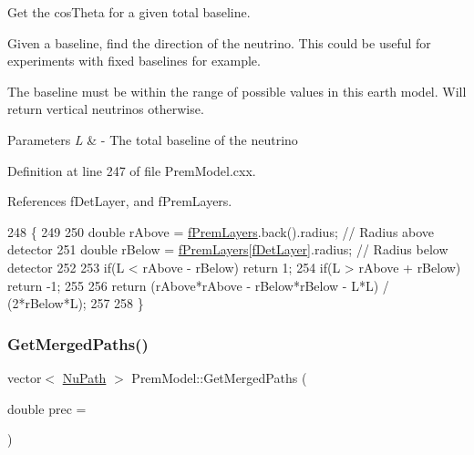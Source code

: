 Get the cos\+Theta for a given total baseline.

Given a baseline, find the direction of the neutrino. This could be useful for experiments with fixed baselines for example.

The baseline must be within the range of possible values in this earth model. Will return vertical neutrinos otherwise.


\begin{DoxyParams}{Parameters}
{\em L} & -\/ The total baseline of the neutrino \\
\hline
\end{DoxyParams}


Definition at line 247 of file Prem\+Model.\+cxx.



References f\+Det\+Layer, and f\+Prem\+Layers.


\begin{DoxyCode}
248 \{
249 
250   \textcolor{keywordtype}{double} rAbove = \hyperlink{classOscProb_1_1PremModel_a19a9a3b23ec154ad7a29f92b74aa5bc6}{fPremLayers}.back().radius;     \textcolor{comment}{// Radius above detector}
251   \textcolor{keywordtype}{double} rBelow = \hyperlink{classOscProb_1_1PremModel_a19a9a3b23ec154ad7a29f92b74aa5bc6}{fPremLayers}[\hyperlink{classOscProb_1_1PremModel_a4fb68506493666349f418b893a996185}{fDetLayer}].radius; \textcolor{comment}{// Radius below detector}
252   
253   \textcolor{keywordflow}{if}(L < rAbove - rBelow) \textcolor{keywordflow}{return}  1;
254   \textcolor{keywordflow}{if}(L > rAbove + rBelow) \textcolor{keywordflow}{return} -1;
255   
256   \textcolor{keywordflow}{return} (rAbove*rAbove - rBelow*rBelow - L*L) / (2*rBelow*L);
257   
258 \}
\end{DoxyCode}
\mbox{\label{classOscProb_1_1PremModel_a5b6f83f2e9b7087e8faad1f19f00ebd5}} 
\subsubsection{\texorpdfstring{Get\+Merged\+Paths()}{GetMergedPaths()}}
{\footnotesize\ttfamily vector$<$ \hyperlink{structOscProb_1_1NuPath}{Nu\+Path} $>$ Prem\+Model\+::\+Get\+Merged\+Paths (\begin{DoxyParamCaption}\item[{double}]{prec = {} }\end{DoxyParamCaption})\hspace{0.3cm}{\ttfamily [virtual]}}

